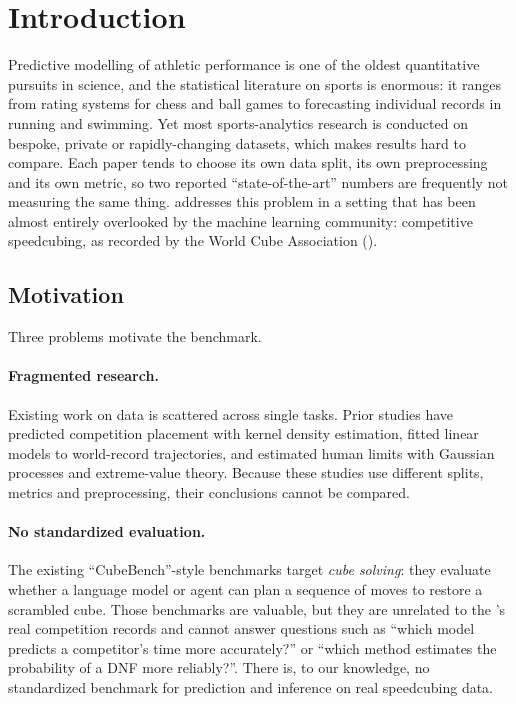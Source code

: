 \section{Introduction}
\label{sec:intro}

Predictive modelling of athletic performance is one of the oldest quantitative
pursuits in science, and the statistical literature on sports is enormous: it
ranges from rating systems for chess and ball games to forecasting individual
records in running and swimming. Yet most sports-analytics research is
conducted on bespoke, private or rapidly-changing datasets, which makes
results hard to compare. Each paper tends to choose its own data split, its own
preprocessing and its own metric, so two reported ``state-of-the-art'' numbers
are frequently not measuring the same thing. \wcabench{} addresses this
problem in a setting that has been almost entirely overlooked by the machine
learning community: competitive speedcubing, as recorded by the World Cube
Association (\wca).

\subsection{Motivation}
\label{sec:motivation}

Three problems motivate the benchmark.
\paragraph{Fragmented research.}
Existing work on \wca{} data is scattered across single tasks. Prior studies
have predicted competition placement with kernel density estimation, fitted
linear models to world-record trajectories, and estimated human limits with
Gaussian processes and extreme-value theory. Because these studies use
different splits, metrics and preprocessing, their conclusions cannot be
compared.
\paragraph{No standardized evaluation.}
The existing ``CubeBench''-style benchmarks target \emph{cube solving}: they
evaluate whether a language model or agent can plan a sequence of moves to
restore a scrambled cube. Those benchmarks are valuable, but they are
unrelated to the \wca's real competition records and cannot answer questions
such as ``which model predicts a competitor's time more accurately?'' or
``which method estimates the probability of a DNF more reliably?''. There is,
to our knowledge, no standardized benchmark for prediction and inference on
real speedcubing data.
